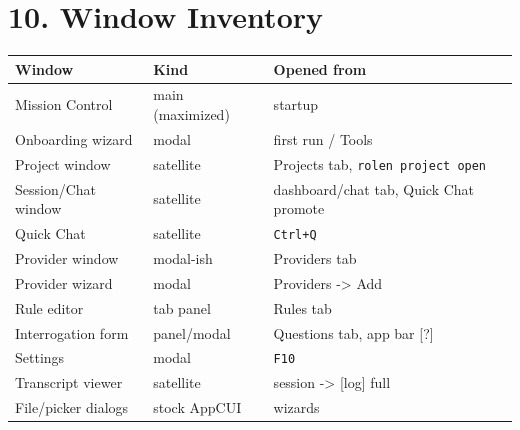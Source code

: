 \documentclass[10pt,a4paper]{article}
\begin{document}
\section{10. Window Inventory}
\begin{small}
\begin{tabularx}{\linewidth}{lXX}
\toprule
Window & Kind & Opened from \\
\midrule
Mission Control & main (maximized) & startup \\
Onboarding wizard & modal & first run / Tools \\
Project window & satellite & Projects tab, \texttt{rolen project open} \\
Session/Chat window & satellite & dashboard/chat tab, Quick Chat promote \\
Quick Chat & satellite & \texttt{Ctrl+Q} \\
Provider window & modal-ish & Providers tab \\
Provider wizard & modal & Providers -> Add \\
Rule editor & tab panel & Rules tab \\
Interrogation form & panel/modal & Questions tab, app bar [?] \\
Settings & modal & \texttt{F10} \\
Transcript viewer & satellite & session -> [log] full \\
File/picker dialogs & stock AppCUI & wizards \\
\bottomrule
\end{tabularx}
\end{small}
\end{document}
